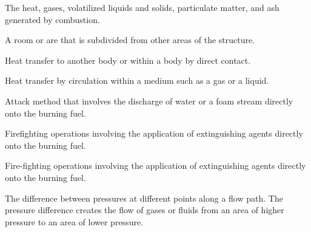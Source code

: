 \begin{description}
\hypertarget{cp}{\item[Combustion Products]} \hfill
\begin{description}[leftmargin=!]
	\item The heat, gases, volatilized liquids and solids, particulate matter, and ash generated by combustion.
\end{description}

\item[Compartment] \hfill
\begin{description}[leftmargin=!]
	\item A room or are that is subdivided from other areas of the structure.
\end{description}

\item[Conduction] \hfill
\begin{description}[leftmargin=!]
	\item Heat transfer to another body or within a body by direct contact.
\end{description}

\item[Convection] \hfill
\begin{description}[leftmargin=!]
	\item Heat transfer by circulation within a medium such as a gas or a liquid. 
\end{description}

\item[Direct Attack] \hfill
\begin{description}[leftmargin=!]
	\item Attack method that involves the discharge of water or a foam stream directly onto the burning fuel.
	\item Firefighting operations involving the application of extinguishing agents directly onto the burning fuel.
	\item Fire-fighting operations involving the application of extinguishing agents directly onto the burning fuel.
\end{description}

\item[Differential Pressure] \hfill
\begin{description}[leftmargin=!]
	\item The difference between pressures at different points along a flow path.  The pressure difference creates the flow of gases or fluids from an area of higher pressure to an area of lower pressure.
\end{description}


\end{description}
